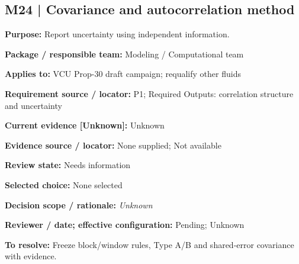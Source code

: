 \documentclass[11pt]{article}
\begin{document}
\par\noindent\begin{minipage}{\textwidth}\small\setlength{\parskip}{2pt}
\subsection*{M24 | Covariance and autocorrelation method}
\textbf{Purpose:} Report uncertainty using independent information.\par
\textbf{Package / responsible team:} Modeling / Computational team\par
\textbf{Applies to:} VCU Prop-30 draft campaign; requalify other fluids\par
\textbf{Requirement source / locator:} P1; Required Outputs: correlation structure and uncertainty\par
\textbf{Current evidence [Unknown]:} Unknown\par
\textbf{Evidence source / locator:} None supplied; Not available\par
\textbf{Review state:} Needs information\par
\textbf{Selected choice:} None selected\par
\textbf{Decision scope / rationale:} \textit{Unknown}\par
\textbf{Reviewer / date; effective configuration:} Pending; Unknown\par
\textbf{To resolve:} Freeze block/window rules, Type A/B and shared-error covariance with evidence.\par
\end{minipage}\par\vspace{5pt}
\end{document}
